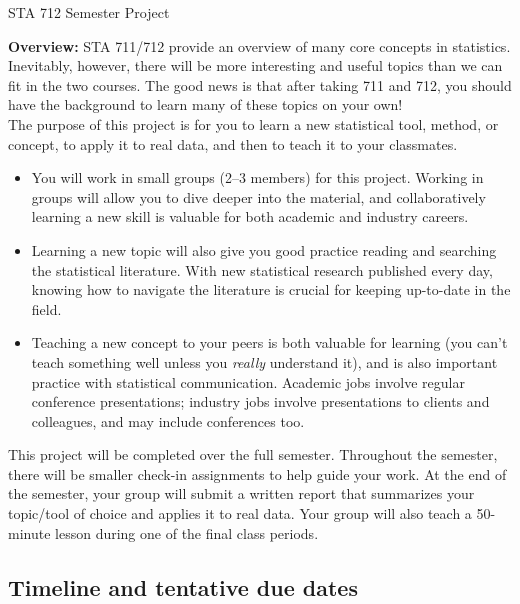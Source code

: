 \documentclass[11pt]{article}
\begin{document}
\begin{center}
\Large
STA 712 Semester Project\\
\normalsize
\vspace{5mm}
\end{center}

\noindent \textbf{Overview:} STA 711/712 provide an overview of many core concepts in statistics. Inevitably, however, there will be more interesting and useful topics than we can fit in the two courses. The good news is that after taking 711 and 712, you should have the background to learn many of these topics on your own! \\

\noindent The purpose of this project is for you to learn a new statistical tool, method, or concept, to apply it to real data, and then to teach it to your classmates. 
\begin{itemize}
\item You will work in small groups (2--3 members) for this project. Working in groups will allow you to dive deeper into the material, and collaboratively learning a new skill is valuable for both academic and industry careers.

\item Learning a new topic will also give you good practice reading and searching the statistical literature. With new statistical research published every day, knowing how to navigate the literature is crucial for keeping up-to-date in the field.

\item Teaching a new concept to your peers is both valuable for learning (you can't teach something well unless you \textit{really} understand it), and is also important practice with statistical communication. Academic jobs involve regular conference presentations; industry jobs involve presentations to clients and colleagues, and may include conferences too.
\end{itemize}

\noindent This project will be completed over the full semester. Throughout the semester, there will be smaller check-in assignments to help guide your work. At the end of the semester, your group will submit a written report that summarizes your topic/tool of choice and applies it to real data. Your group will also teach a 50-minute lesson during one of the final class periods.

\subsection*{Timeline and tentative due dates}
\end{document}
